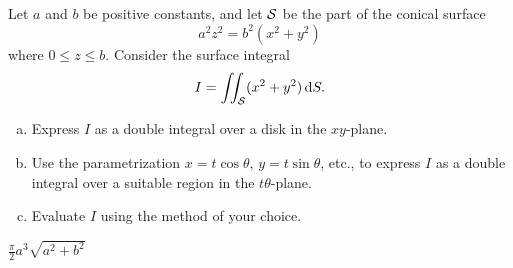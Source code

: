 \begin{question}[M317 2000D] %
Let $a$ and $b$ be positive constants, and let $\mathcal{S}$ be
the part of the conical surface
$$
a^2 z^2 = b^2(x^2+y^2)
$$
where $0\le z\le b$.
Consider the surface integral
$$
I = \iint_{\mathcal{S}} (x^2+y^2)\,\mathrm{d}S.
$$
\begin{enumerate}[(a)]
\item
Express $I$ as a double integral over a disk
in the $xy$-plane.

\item
Use the parametrization $x=t\cos\theta$, $y=t\sin\theta$, etc.,
to express $I$ as a double integral over a suitable region in the
$t\theta$-plane.

\item
Evaluate $I$ using the method of your choice.
\end{enumerate}

\end{question}


\begin{answer} 
$\frac{\pi}{ 2}a^3\sqrt{a^2+b^2}$
\end{answer}

